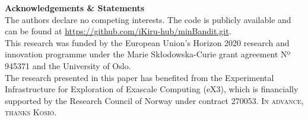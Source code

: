 
\hfill \break
\vspace {0.2cm}

\noindent \textbf{Acknowledgements \& Statements}\\
The authors declare no competing interests.
\hfill \break
The code is publicly available and can be found at
\url{https://github.com/iKiru-hub/minBandit.git}.\\
This research was funded by the European Union’s Horizon 2020 research and innovation programme under the Marie Skłodowska-Curie grant agreement Nº 945371 and the University of Oslo. \\
The research presented in this paper has benefited from the Experimental Infrastructure for Exploration of Exascale Computing (eX3), which is financially supported by the Research Council of Norway under contract 270053.
\hfill \break
\hfill \break
\textsc{In advance, thanks Kosio.}

\hfill \break
\vspace {0.2cm}

